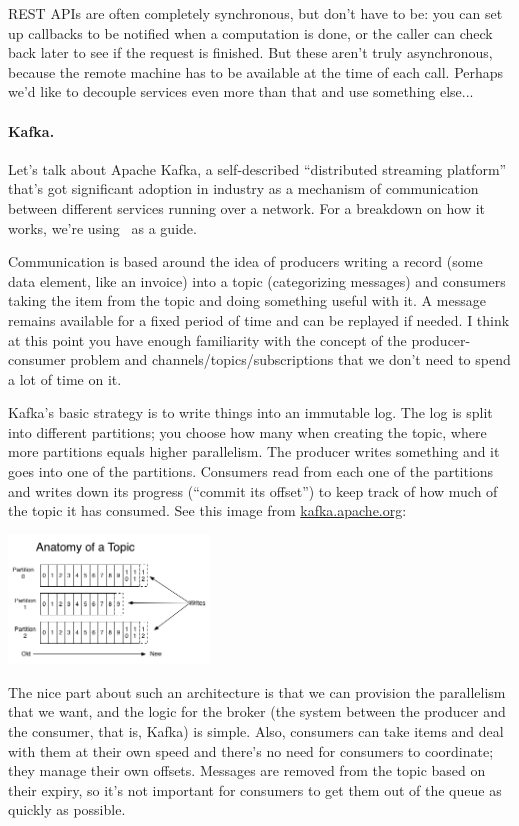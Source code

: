 REST APIs are often completely synchronous, but don't have to be: 
you can set up  callbacks to be notified when a computation is done, or
the caller can check back later to see if the request is finished. But these
aren't truly asynchronous, because the remote machine has to be available at
the time of each call. Perhaps we'd like to decouple services even more than
that and use something else...

\paragraph{Kafka.} 
Let's talk about Apache Kafka, a self-described ``distributed streaming platform'' that's got significant adoption in industry as a mechanism of communication between different services running over a network. For a breakdown on how it works, we're using~\cite{kafka} as a guide.

Communication is based around the idea of producers writing a record (some data element, like an invoice) into a topic (categorizing messages) and consumers taking the item from the topic and doing something useful with it. A message remains available for a fixed period of time and can be replayed if needed. I think at this point you have enough familiarity with the concept of the producer-consumer problem and channels/topics/subscriptions that we don't need to spend a lot of time on it. 


Kafka's basic strategy is to write things into an immutable log. The log is split into different partitions; you choose how many when creating the topic, where more partitions equals higher parallelism. The producer writes something and it goes into one of the partitions. Consumers read from each one of the partitions and writes down its progress (``commit its offset'') to keep track of how much of the topic it has consumed.  See this image from \url{kafka.apache.org}:

\begin{center}
	\includegraphics[width=0.4\textwidth]{images/kafka-partition.png}
\end{center}

The nice part about such an architecture is that we can provision the parallelism that we want, and the logic for the broker (the system between the producer and the consumer, that is, Kafka) is simple. Also, consumers can take items and deal with them at their own speed and there's no need for consumers to coordinate; they manage their own offsets. Messages are removed from the topic based on their expiry, so it's not important for consumers to get them out of the queue as quickly as possible.

